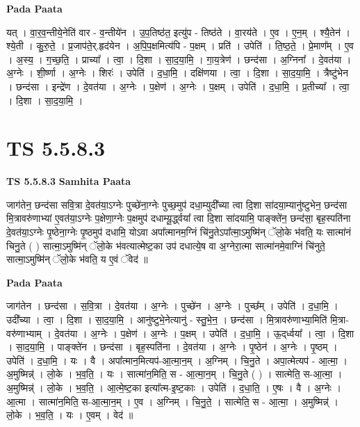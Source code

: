 \documentclass[17pt]{extarticle}
\begin{document}
\textbf{Pada Paata} \newline

यत् । वा॒र॒व॒न्तीये॒नेति॑ वार - व॒न्तीये॑न । उ॒प॒तिष्ठ॑त॒ इत्यु॑प - तिष्ठ॑ते । वा॒रय॑ते । ए॒व । ए॒न॒म् । श्यै॒तेन॑ । श्ये॒ती । कु॒रु॒ते॒ । प्र॒जाप॑ते॒र्.हृद॑येन । अ॒पि॒प॒क्षमित्य॑पि - प॒क्षम् । प्रति॑ । उपेति॑ । ति॒ष्ठ॒ते॒ । प्रे॒माण᳚म् । ए॒व । अ॒स्य॒ । ग॒च्छ॒ति॒ । प्राच्या᳚ । त्वा॒ । दि॒शा । सा॒द॒या॒मि॒ । गा॒य॒त्रेण॑ । छन्द॑सा । अ॒ग्निना᳚ । दे॒वत॑या । अ॒ग्नेः । शी॒र्ष्णा । अ॒ग्नेः । शिरः॑ । उपेति॑ । द॒धा॒मि॒ । दक्षि॑णया । त्वा॒ । दि॒शा । सा॒द॒या॒मि॒ । त्रैष्टु॑भेन । छन्द॑सा । इन्द्रे॑ण । दे॒वत॑या । अ॒ग्नेः । प॒क्षेण॑ । अ॒ग्नेः । प॒क्षम् । उपेति॑ । द॒धा॒मि॒ । प्र॒तीच्या᳚ । त्वा॒ । दि॒शा । सा॒द॒या॒मि॒ ।  \newline





\section{ TS 5.5.8.3 }

\textbf{TS 5.5.8.3 } \newline
\textbf{Samhita Paata} \newline

जाग॑तेन॒ छन्द॑सा सवि॒त्रा दे॒वत॑या॒ऽग्नेः पुच्छे॑ना॒ग्नेः पुच्छ॒मुप॑ दधा॒म्युदी᳚च्या त्वा दि॒शा सा॑दया॒म्यानु॑ष्टुभेन॒ छन्द॑सा मि॒त्रावरु॑णाभ्यां ए॒वत॑या॒ऽग्नेः प॒क्षेणा॒ग्नेः प॒क्षमुप॑ दधाम्यू॒र्द्ध्वया᳚ त्वा दि॒शा सा॑दयामि॒ पाङ्क्ते॑न॒ छन्द॑सा॒ बृह॒स्पति॑ना दे॒वत॑या॒ऽग्नेः पृ॒ष्ठेना॒ग्नेः पृ॒ष्ठमुप॑ दधामि॒ योऽवा अपा᳚त्मानम॒ग्निं चि॑नु॒तेऽपा᳚त्मा॒ऽमुष्मि॑न् ॅलो॒के भ॑वति॒ यः सात्मा॑नं चिनु॒ते ( ) सात्मा॒ऽमुष्मि॑न् ॅलो॒के भ॑वत्यात्मेष्ट॒का उप॑ दधात्ये॒ष वा अ॒ग्नेरा॒त्मा सात्मा॑नमे॒वाग्निं चि॑नुते॒ सात्मा॒ऽमुष्मि॑न् ॅलो॒के भ॑वति॒ य ए॒वं ॅवेद॑ ॥ \newline

\textbf{Pada Paata} \newline

जाग॑तेन । छन्द॑सा । स॒वि॒त्रा । दे॒वत॑या । अ॒ग्नेः । पुच्छे॑न । अ॒ग्नेः । पुच्छ᳚म् । उपेति॑ । द॒धा॒मि॒ । उदी᳚च्या । त्वा॒ । दि॒शा । सा॒द॒या॒मि॒ । आनु॑ष्टुभे॒नेत्यानु॑ - स्तु॒भे॒न॒ । छन्द॑सा । मि॒त्रावरु॑णाभ्या॒मिति॑ मि॒त्रा-वरु॑णाभ्याम् । दे॒वत॑या । अ॒ग्नेः । प॒क्षेण॑ । अ॒ग्नेः । प॒क्षम् । उपेति॑ । द॒धा॒मि॒ । ऊ॒द्‌र्ध्वया᳚ । त्वा॒ । दि॒शा । सा॒द॒या॒मि॒ । पाङ्क्ते॑न । छन्द॑सा । बृह॒स्पति॑ना । दे॒वत॑या । अ॒ग्नेः । पृ॒ष्ठेन॑ । अ॒ग्नेः । पृ॒ष्ठम् । उपेति॑ । द॒धा॒मि॒ । यः । वै । अपा᳚त्मान॒मित्यप॑-आ॒त्मा॒न॒म् । अ॒ग्निम् । चि॒नु॒ते । अपा॒त्मेत्यप॑ - आ॒त्मा॒ । अ॒मुष्मिन्न्॑ । लो॒के । भ॒व॒ति॒ । यः । सात्मा॑न॒मिति॒ स - आ॒त्मा॒न॒म् । चि॒नु॒ते ( ) । सात्मेति॒ स-आ॒त्मा॒ । अ॒मुष्मिन्न्॑ । लो॒के । भ॒व॒ति॒ । आ॒त्मे॒ष्ट॒का इत्या᳚त्म-इ॒ष्ट॒काः । उपेति॑ । द॒धा॒ति॒ । ए॒षः । वै । अ॒ग्नेः । आ॒त्मा । सात्मा॑न॒मिति॒ स-आ॒त्मा॒न॒म् । ए॒व । अ॒ग्निम् । चि॒नु॒ते॒ । सात्मेति॒ स - आ॒त्मा॒ । अ॒मुष्मिन्न्॑ । लो॒के । भ॒व॒ति॒ । यः । ए॒वम् । वेद॑ ॥  \newline
\end{document}
